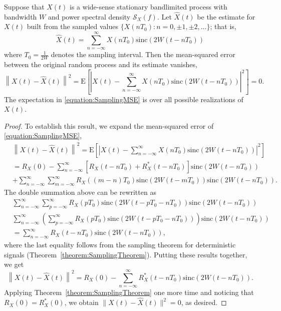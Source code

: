 \begin{theorem} \label{theorem:SamplingRandomSignals}
Suppose that $X(t)$ is a wide-sense stationary bandlimited process with bandwidth $W$ and power spectral density $\mathcal{S}_X (f)$.
Let $\hat{X}(t)$ be the estimate for $X(t)$ built from the sampled values $\{ X(nT_0) : n = 0, \pm 1, \pm 2, \ldots \}$; that is,
\begin{equation*}
\hat{X}(t) = \sum_{n=-\infty}^{\infty} X(nT_0) \mathrm{sinc} (2 W (t - nT_0))
\end{equation*}
where $T_0 = \frac{1}{2W}$ denotes the sampling interval.
Then the mean-squared error between the original random process and its estimate vanishes,
\begin{equation} \label{equation:SamplingMSE}
\left\| X(t) - \hat{X}(t) \right\|^2
= \mathrm{E} \left[ \left| X(t) - \sum_{n=-\infty}^{\infty}
X(nT_0) \mathrm{sinc} (2 W (t - nT_0)) \right|^2 \right] = 0 .
\end{equation}
The expectation in \eqref{equation:SamplingMSE} is over all possible realizations of $X(t)$.
\end{theorem}
\begin{proof}
To establish this result, we expand the mean-squared error of \eqref{equation:SamplingMSE},
\begin{equation*}
\begin{split}
&\left\| X(t) - \hat{X}(t) \right\|^2
= \mathrm{E} \left[ \left| X(t) - \sum_{n=-\infty}^{\infty} X(nT_0)
\mathrm{sinc}(2 W (t - nT_0)) \right|^2 \right] \\
&= R_X(0) - \sum_{n=-\infty}^{\infty} [ R_X(t-nT_0) + R_X^*(t-nT_0) ]
\mathrm{sinc}(2 W (t - nT_0)) \\
&+ \sum_{n=-\infty}^{\infty} \sum_{m=-\infty}^{\infty} R_X((m-n)T_0)
\mathrm{sinc}(2 W (t - mT_0)) \mathrm{sinc}(2 W (t - nT_0)) .
\end{split}
\end{equation*}
The double summation above can be rewritten as
\begin{equation*}
\begin{split}
&\sum_{n=-\infty}^{\infty} \sum_{p=-\infty}^{\infty} R_X(pT_0)
\mathrm{sinc}(2 W (t - pT_0 - nT_0)) \mathrm{sinc}(2 W (t - nT_0)) \\
&\sum_{n=-\infty}^{\infty} \left( \sum_{p=-\infty}^{\infty} R_X(pT_0)
\mathrm{sinc}(2 W (t - pT_0 - nT_0)) \right) \mathrm{sinc}(2 W (t - nT_0)) \\
&= \sum_{n=-\infty}^{\infty} R_X(t - nT_0) \mathrm{sinc}(2 W (t - nT_0)) ,
\end{split}
\end{equation*}
where the last equality follows from the sampling theorem for deterministic signals (Theorem~\ref{theorem:SamplingTheorem}).
Putting these results together, we get
\begin{equation*}
\left\| X(t) - \hat{X}(t) \right\|^2
= R_X(0) - \sum_{n=-\infty}^{\infty} R_X^*(t-nT_0) \mathrm{sinc}(2 W (t - nT_0)) .
\end{equation*}
Applying Theorem~\ref{theorem:SamplingTheorem} one more time and noticing that $R_X(0) = R_X^*(0)$, we obtain $\| X(t) - \hat{X}(t) \|^2 = 0$, as desired.
\end{proof}

